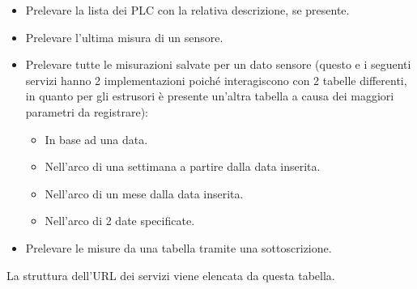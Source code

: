 \begin{itemize}
	\item Prelevare la lista dei PLC con la relativa descrizione, se presente.
	\item Prelevare l’ultima misura di un sensore.
	\item Prelevare tutte le misurazioni salvate per un dato sensore (questo e i seguenti servizi hanno 2 implementazioni poiché interagiscono con 2 tabelle differenti, in quanto per gli estrusori è presente un’altra tabella a causa dei maggiori parametri da registrare): \begin{itemize}
		\item In base ad una data.
		\item Nell’arco di una settimana a partire dalla data inserita.
		\item Nell’arco di un mese dalla data inserita.
		\item Nell’arco di 2 date specificate.	
	\end{itemize}
	\item Prelevare le misure da una tabella tramite una sottoscrizione.
\end{itemize}
La struttura dell’URL dei servizi viene elencata da questa tabella.
